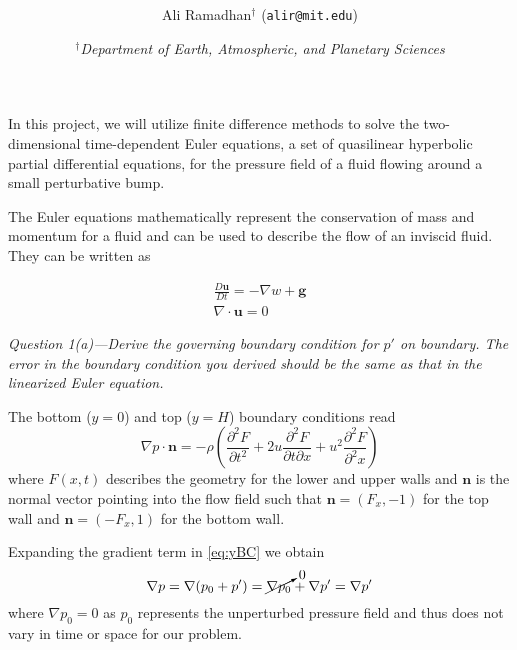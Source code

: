 \documentclass[11pt]{article}
\title{\spacedlowsmallcaps{6.339: Numerical Methods for Partial Differential Equations}\\ \spacedlowsmallcaps{Project one: Finite Difference Methods}}
\author{Ali Ramadhan$^\text{†}$ (\texttt{alir@mit.edu})}
\date{\textit{$^\text{†}$Department of Earth, Atmospheric, and Planetary Sciences}}
\begin{document}
\maketitle

In this project, we will utilize finite difference methods to solve the two-dimensional time-dependent Euler equations, a set of quasilinear hyperbolic partial differential equations, for the pressure field of a fluid flowing around a small perturbative bump.


The Euler equations mathematically represent the conservation of mass and momentum for a fluid and can be used to describe the flow of an inviscid fluid. They can be written as

\begin{subequations}
\begin{align} 
\frac{D\mathbf{u}}{Dt} = - \nabla w + \mathbf{g} \\
\nabla\cdot\mathbf{u} = 0
\end{align}
\end{subequations}

\begin{tcolorbox}
  \textit{Question 1(a)---Derive the governing boundary condition for $p'$ on boundary. The error in the boundary condition you derived should be the same as that in the linearized Euler equation.}
\end{tcolorbox}

The bottom ($y=0$) and top ($y=H$) boundary conditions read
\begin{equation} \label{eq:yBC}
\nabla p \cdot \mathbf{n} = -\rho \left( \frac{\partial^2 F}{\partial t^2} + 2u\frac{\partial^2 F}{\partial t \partial x} + u^2 \frac{\partial^2 F}{\partial^2 x} \right)
\end{equation}
where $F(x,t)$ describes the geometry for the lower and upper walls and $\mathbf{n}$ is the normal vector pointing into the flow field such that $\mathbf{n} = (F_x, -1)$ for the top wall and $\mathbf{n} = (-F_x, 1)$ for the bottom wall.

Expanding the gradient term in \eqref{eq:yBC} we obtain 
\begin{equation}
  \nabla p = \nabla(p_0 + p') = \cancelto{0}{\nabla p_0} + \nabla p' = \nabla p'
\end{equation}
where $\nabla p_0 = 0$ as $p_0$ represents the unperturbed pressure field and thus does not vary in time or space for our problem.
\end{document}
